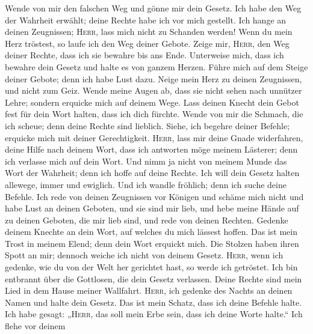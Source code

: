  Wende von mir den falschen Weg und gönne mir dein
Gesetz.  Ich habe den Weg der Wahrheit erwählt; deine
Rechte habe ich vor mich gestellt.  Ich hange an deinen
Zeugnissen; \textsc{Herr}, lass mich nicht zu Schanden werden!
 Wenn du mein Herz tröstest, so laufe ich den Weg deiner
Gebote.  Zeige mir, \textsc{Herr}, den Weg deiner Rechte,
dass ich sie bewahre bis ans Ende.  Unterweise mich, dass
ich bewahre dein Gesetz und halte es von ganzem Herzen. 
Führe mich auf dem Steige deiner Gebote; denn ich habe Lust dazu.
 Neige mein Herz zu deinen Zeugnissen, und nicht zum
Geiz.  Wende meine Augen ab, dass sie nicht sehen nach
unnützer Lehre; sondern erquicke mich auf deinem Wege. 
Lass deinen Knecht dein Gebot fest für dein Wort halten, dass ich dich
fürchte.  Wende von mir die Schmach, die ich scheue; denn
deine Rechte sind lieblich.  Siehe, ich begehre deiner
Befehle; erquicke mich mit deiner Gerechtigkeit. 
\textsc{Herr}, lass mir deine Gnade widerfahren, deine Hilfe nach deinem
Wort,  dass ich antworten möge meinem Lästerer; denn ich
verlasse mich auf dein Wort.  Und nimm ja nicht von
meinem Munde das Wort der Wahrheit; denn ich hoffe auf deine Rechte.
 Ich will dein Gesetz halten allewege, immer und
ewiglich.  Und ich wandle fröhlich; denn ich suche deine
Befehle.  Ich rede von deinen Zeugnissen vor Königen und
schäme mich nicht  und habe Lust an deinen Geboten, und
sie sind mir lieb,  und hebe meine Hände auf zu deinen
Geboten, die mir lieb sind, und rede von deinen Rechten. 
Gedenke deinem Knechte an dein Wort, auf welches du mich lässest hoffen.
 Das ist mein Trost in meinem Elend; denn dein Wort
erquickt mich.  Die Stolzen haben ihren Spott an mir;
dennoch weiche ich nicht von deinem Gesetz. 
\textsc{Herr}, wenn ich gedenke, wie du von der Welt her gerichtet hast,
so werde ich getröstet.  Ich bin entbrannt über die
Gottlosen, die dein Gesetz verlassen.  Deine Rechte sind
mein Lied in dem Hause meiner Wallfahrt.  \textsc{Herr},
ich gedenke des Nachts an deinen Namen und halte dein Gesetz.
 Das ist mein Schatz, dass ich deine Befehle halte.
 Ich habe gesagt: „\textsc{Herr}, das soll mein Erbe
sein, dass ich deine Worte halte.``  Ich flehe vor deinem
